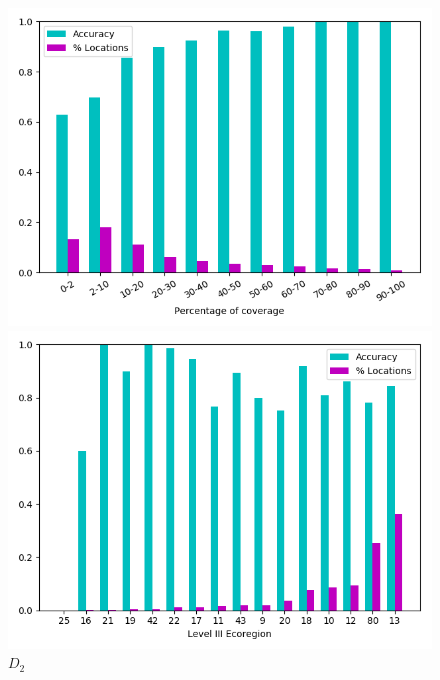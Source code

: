 \def\year{2017}\relax \documentclass[letterpaper]{article}
\begin{document}
\begin{figure}
\centering
\begin{minipage}{.24\textwidth}
  \centering
\includegraphics[width=\textwidth]{pics/d4_accuracy_vs_coverage.png}
\caption{$D_1$}
\end{minipage}
\begin{minipage}{.01\textwidth}
\end{minipage}
\begin{minipage}{.24\textwidth}
  \centering
\includegraphics[width=\textwidth]{pics/d4_accuracy_vs_ecoregion.png}
\caption{$D_2$}
\end{minipage}
\begin{minipage}{.24\textwidth}

\end{minipage}
\end{figure}
\end{document}
